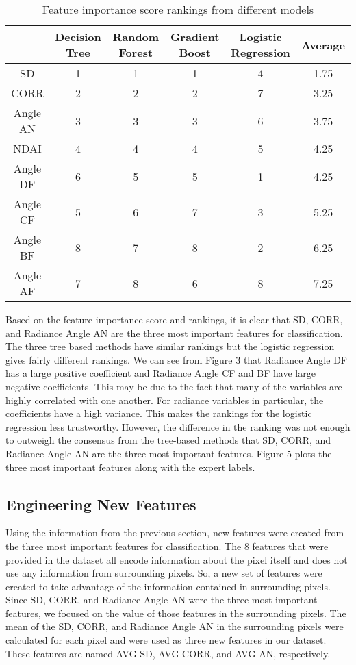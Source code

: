 \documentclass[11pt,letterpaper]{article}
\begin{document}
\begin{center}
\begin{table}[H]
\centering
\caption{Feature importance score rankings from different models}
\renewcommand{\arraystretch}{1}
\begin{tabular}{|c|c|c|c|c|c|}
\hline
 & Decision Tree & Random Forest & Gradient Boost & Logistic Regression & Average \\ \hline
SD & 1 & 1 & 1 & 4 & 1.75 \\ \hline
CORR & 2 & 2 & 2 & 7 & 3.25 \\ \hline
Angle AN & 3 & 3 & 3 & 6 & 3.75 \\ \hline
NDAI & 4 & 4 & 4 & 5 & 4.25 \\ \hline
Angle DF & 6 & 5 & 5 & 1 & 4.25 \\ \hline
Angle CF & 5 & 6 & 7 & 3 & 5.25 \\ \hline
Angle BF & 8 & 7 & 8 & 2 & 6.25 \\ \hline
Angle AF & 7 & 8 & 6 & 8 & 7.25 \\ \hline
\end{tabular}
\end{table}
\end{center}

Based on the feature importance score and rankings, it is clear that SD, CORR, and Radiance Angle AN are the three most important features for classification. The three tree based methods have similar rankings but the logistic regression gives fairly different rankings. We can see from Figure 3 that Radiance Angle DF has a large positive coefficient and Radiance Angle CF and BF have large negative coefficients. This may be due to the fact that many of the variables are highly correlated with one another. For radiance variables in particular, the coefficients have a high variance. This makes the rankings for the logistic regression less trustworthy. However, the difference in the ranking was not enough to outweigh the consensus from the tree-based methods that SD, CORR, and Radiance Angle AN are the three most important features. Figure 5 plots the three most important features along with the expert labels.

\subsection{Engineering New Features}
Using the information from the previous section, new features were created from the three most important features for classification. The 8 features that were provided in the dataset all encode information about the pixel itself and does not use any information from surrounding pixels. So, a new set of features were created to take advantage of the information contained in surrounding pixels. Since SD, CORR, and Radiance Angle AN were the three most important features, we focused on the value of those features in the surrounding pixels. The mean of the SD, CORR, and Radiance Angle AN in the surrounding pixels were calculated for each pixel and were used as three new features in our dataset. These features are named AVG SD, AVG CORR, and AVG AN, respectively.
\end{document}
